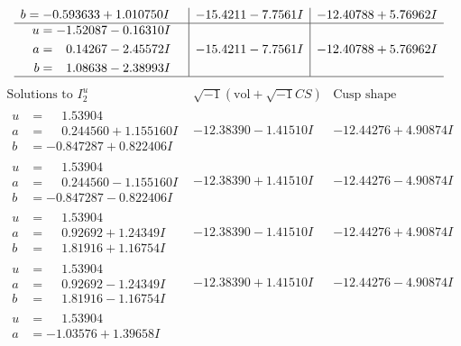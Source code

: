 \documentclass[1p]{elsarticle_modified}
\theoremstyle{definition}
\newcommand{\I}{\sqrt{-1}}
\begin{document}
$$\begin{array}{c|c|c}
\begin{aligned}
b &= -0.593633 + 1.010750 I\end{aligned}
 & -15.4211 - 7.7561 I & -12.40788 + 5.76962 I \\ \hline\begin{aligned}
u &= -1.52087 - 0.16310 I \\
a &= \phantom{-}0.14267 - 2.45572 I \\
b &= \phantom{-}1.08638 - 2.38993 I\end{aligned}
 & -15.4211 - 7.7561 I & -12.40788 + 5.76962 I\\
 \hline 
 \end{array}$$\newpage$$\begin{array}{c|c|c}  
\text{Solutions to }I^u_{2}& \I (\text{vol} + \sqrt{-1}CS) & \text{Cusp shape}\\
 \hline 
\begin{aligned}
u &= \phantom{-}1.53904\phantom{ +0.000000I} \\
a &= \phantom{-}0.244560 + 1.155160 I \\
b &= -0.847287 + 0.822406 I\end{aligned}
 & -12.38390 - 1.41510 I & -12.44276 + 4.90874 I \\ \hline\begin{aligned}
u &= \phantom{-}1.53904\phantom{ +0.000000I} \\
a &= \phantom{-}0.244560 - 1.155160 I \\
b &= -0.847287 - 0.822406 I\end{aligned}
 & -12.38390 + 1.41510 I & -12.44276 - 4.90874 I \\ \hline\begin{aligned}
u &= \phantom{-}1.53904\phantom{ +0.000000I} \\
a &= \phantom{-}0.92692 + 1.24349 I \\
b &= \phantom{-}1.81916 + 1.16754 I\end{aligned}
 & -12.38390 - 1.41510 I & -12.44276 + 4.90874 I \\ \hline\begin{aligned}
u &= \phantom{-}1.53904\phantom{ +0.000000I} \\
a &= \phantom{-}0.92692 - 1.24349 I \\
b &= \phantom{-}1.81916 - 1.16754 I\end{aligned}
 & -12.38390 + 1.41510 I & -12.44276 - 4.90874 I \\ \hline\begin{aligned}
u &= \phantom{-}1.53904\phantom{ +0.000000I} \\
a &= -1.03576 + 1.39658 I \\

\end{aligned}
\end{array}$$
\end{document}

